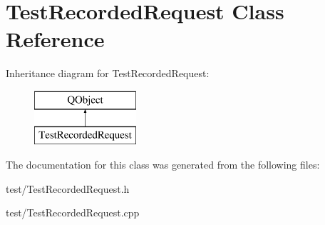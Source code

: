 \hypertarget{class_test_recorded_request}{\section{Test\+Recorded\+Request Class Reference}
\label{class_test_recorded_request}
}
Inheritance diagram for Test\+Recorded\+Request\+:\begin{figure}[H]
\begin{center}
\leavevmode
\includegraphics[height=2.000000cm]{class_test_recorded_request}
\end{center}
\end{figure}


The documentation for this class was generated from the following files\+:\begin{DoxyCompactItemize}
\item 
test/Test\+Recorded\+Request.\+h\item 
test/Test\+Recorded\+Request.\+cpp\end{DoxyCompactItemize}
